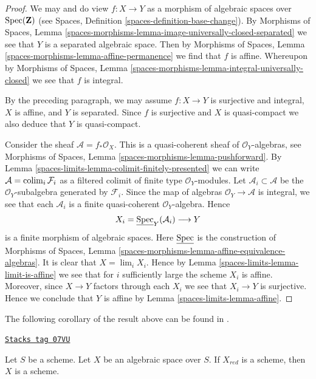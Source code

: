 \begin{proof}
We may and do view $f : X \to Y$ as a morphism of algebraic spaces over
$\operatorname{Spec}(\mathbf{Z})$ (see
Spaces, Definition \ref{spaces-definition-base-change}).
By Morphisms of Spaces, Lemma
\ref{spaces-morphisms-lemma-image-universally-closed-separated}
we see that $Y$ is a separated algebraic space. Then by
Morphisms of Spaces, Lemma \ref{spaces-morphisms-lemma-affine-permanence}
we find that $f$ is affine. Whereupon by
Morphisms of Spaces, Lemma
\ref{spaces-morphisms-lemma-integral-universally-closed}
we see that $f$ is integral.

\medskip\noindent
By the preceding paragraph, we may assume $f : X \to Y$
is surjective and integral, $X$ is affine, and $Y$ is separated.
Since $f$ is surjective and $X$ is quasi-compact we also deduce that $Y$ is
quasi-compact.

\medskip\noindent
Consider the sheaf $\mathcal{A} = f_*\mathcal{O}_X$.
This is a quasi-coherent sheaf of $\mathcal{O}_Y$-algebras, see
Morphisms of Spaces, Lemma \ref{spaces-morphisms-lemma-pushforward}.
By Lemma \ref{spaces-limits-lemma-colimit-finitely-presented}
we can write $\mathcal{A} = \operatorname{colim}_i \mathcal{F}_i$ as a filtered
colimit of finite type $\mathcal{O}_Y$-modules. Let
$\mathcal{A}_i \subset \mathcal{A}$ be the $\mathcal{O}_Y$-subalgebra
generated by $\mathcal{F}_i$. Since the map of algebras
$\mathcal{O}_Y \to \mathcal{A}$ is integral, we see that each $\mathcal{A}_i$
is a finite quasi-coherent $\mathcal{O}_Y$-algebra. Hence
$$
X_i = \underline{\operatorname{Spec}}_Y(\mathcal{A}_i) \longrightarrow Y
$$
is a finite morphism of algebraic spaces. Here
$\underline{\operatorname{Spec}}$ is the construction of Morphisms of Spaces, Lemma
\ref{spaces-morphisms-lemma-affine-equivalence-algebras}.
It is clear
that $X = \lim_i X_i$. Hence by
Lemma \ref{spaces-limits-lemma-limit-is-affine}
we see that for $i$ sufficiently large the scheme $X_i$ is affine.
Moreover, since $X \to Y$ factors through each $X_i$ we see that
$X_i \to Y$ is surjective. Hence we conclude that $Y$ is affine by
Lemma \ref{spaces-limits-lemma-affine}.
\end{proof}

The following corollary of the result above can be found in
\cite{CLO}.

\begin{lemma}
\label{spaces-limits-lemma-reduction-scheme}
\href{https://stacks.math.columbia.edu/tag/07VU}{\texttt{Stacks tag 07VU}}

\begin{reference}
\cite[3.1.12]{CLO}
\end{reference}
Let $S$ be a scheme. Let $X$ be an algebraic space over $S$.
If $X_{red}$ is a scheme, then $X$ is a scheme.
\end{lemma}

